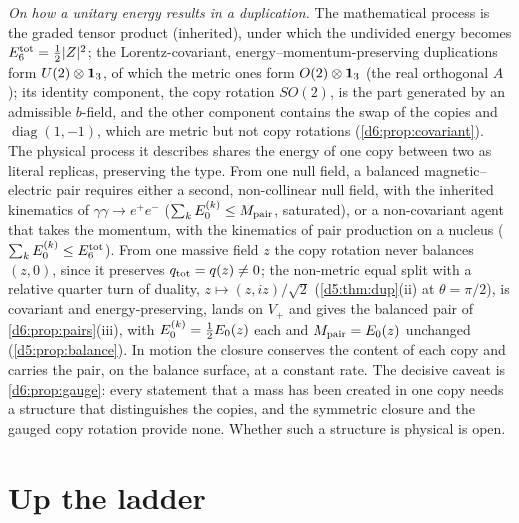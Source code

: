 \emph{On how a unitary energy results in a duplication.} The mathematical process is the graded tensor product (inherited), under which the
undivided energy becomes $E_6^{\rm tot}=\tfrac12|Z|^2$; the Lorentz-covariant, energy--momentum-preserving duplications form $U(2)\otimes\mathbf 1_3$, of
which the metric ones form $O(2)\otimes\mathbf 1_3$ (the real orthogonal $A$); its identity component, the copy rotation $SO(2)$, is the part generated by an admissible $b$-field, and the other component contains the swap of the copies and $\operatorname{diag}(1,-1)$, which are metric but not copy rotations (\cref{d6:prop:covariant}). The physical process it
describes shares the energy of one copy between two as literal replicas, preserving the type. From one null field, a balanced magnetic--electric pair requires either
a second, non-collinear null field, with the inherited kinematics of $\gamma\gamma\to e^+e^-$ ($\sum_kE_0^{(k)}\le M_{\rm pair}$, saturated), or a
non-covariant agent that takes the momentum, with the kinematics of pair production on a nucleus ($\sum_kE_0^{(k)}\le E_6^{\rm tot}$). From one massive field $z$ the copy rotation never balances $(z,0)$, since it preserves $q_{\rm tot}=q(z)\neq0$; the non-metric equal split with a relative quarter turn of duality, $z\mapsto(z,iz)/\sqrt2$ (\cref{d5:thm:dup}(ii) at $\theta=\pi/2$), is covariant and energy-preserving, lands on $V_+$ and gives the balanced pair of \cref{d6:prop:pairs}(iii), with $E_0^{(k)}=\tfrac12 E_0(z)$ each and $M_{\rm pair}=E_0(z)$ unchanged (\cref{d5:prop:balance}). In motion
the closure conserves the content of each copy and carries the pair, on the balance surface, at a constant rate. The decisive caveat is
\cref{d6:prop:gauge}: every statement that a mass has been created in one copy needs a structure that distinguishes the copies, and the
symmetric closure and the gauged copy rotation provide none. Whether such a structure is physical is open.


\section{Up the ladder}
\label{e3:sec:main}


